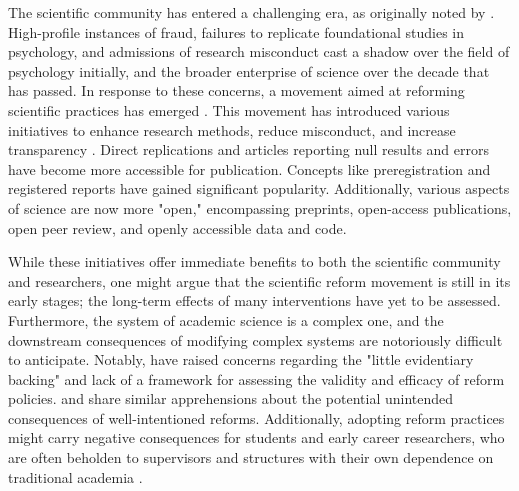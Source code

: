 \documentclass[authordate, editorial,noabstract]{jote-new-article}
\author[1]{\mbox{Sarahanne Field\orcid{0000-0001-7874-1261}}}
\affil[1]{University of Groningen}
\author[2]{\mbox{Noah van Dongen\orcid{0000-0003-0387-7388}}}
\affil[2]{University of Amsterdam}
\author[3]{\mbox{Leonid Tiokhin\orcid{0000-0001-7333-0383}}}
\affil[3]{IG\&H: Utrecht}
\begin{document}
\begin{frontmatter}
  \maketitle
  \begin{abstract}
    \printabstracttext
  \end{abstract}
\end{frontmatter}












	The scientific community has entered a challenging era, as originally noted by \textcite{Wagenmakers2012}. High-profile instances of fraud, failures to replicate foundational studies in psychology, and admissions of research misconduct \parencites[e.g.,][]{John2012} cast a shadow over the field of psychology initially, and the broader enterprise of science over the decade that has passed. In response to these concerns, a movement aimed at reforming scientific practices has emerged \parencites{Field2022}{Munafo2017}{Spellman2018}. This movement has introduced various initiatives to enhance research methods, reduce misconduct, and increase transparency \parencites[see][for an overview]{van2023perspectives}. Direct replications and articles reporting null results and errors \parencites[such as the\emph{ Journal of Trial and Error}; see][]{Devine_2020} have become more accessible for publication. Concepts like preregistration and registered reports have gained significant popularity. Additionally, various aspects of science are now more "open," encompassing preprints, open-access publications, open peer review, and openly accessible data and code.



While these initiatives offer immediate benefits to both the scientific community and researchers, one might argue that the scientific reform movement is still in its early stages; the long-term effects of many interventions have yet to be assessed. Furthermore, the system of academic science is a complex one, and the downstream consequences of modifying complex systems are notoriously difficult to anticipate. Notably, \textcite{Devezer2020} have raised concerns regarding the "little evidentiary backing" and lack of a framework for assessing the validity and efficacy of reform policies. \textcite{Ioannidis2014} and \textcite{Tiokhin2021} share similar apprehensions about the potential unintended consequences of well-intentioned reforms. Additionally, adopting reform practices might carry negative consequences for students and early career researchers, who are often beholden to supervisors and structures with their own dependence on traditional academia \parencites{Field2023}.
\end{document}
